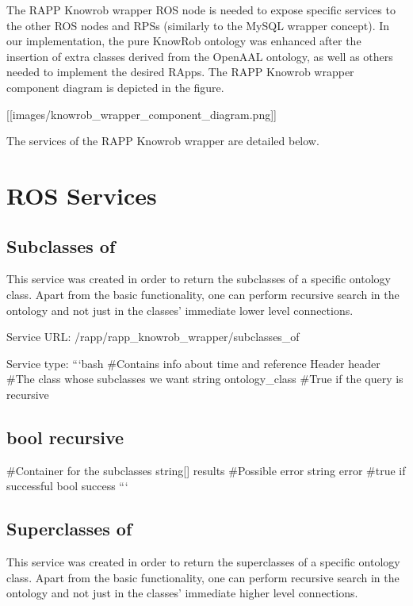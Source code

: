 The R\-A\-P\-P Knowrob wrapper R\-O\-S node is needed to expose specific services to the other R\-O\-S nodes and R\-P\-Ss (similarly to the My\-S\-Q\-L wrapper concept). In our implementation, the pure Know\-Rob ontology was enhanced after the insertion of extra classes derived from the Open\-A\-A\-L ontology, as well as others needed to implement the desired R\-Apps. The R\-A\-P\-P Knowrob wrapper component diagram is depicted in the figure.

\mbox{[}\mbox{[}images/knowrob\-\_\-wrapper\-\_\-component\-\_\-diagram.\-png\mbox{]}\mbox{]}

The services of the R\-A\-P\-P Knowrob wrapper are detailed below.

\section*{R\-O\-S Services}

\subsection*{Subclasses of}

This service was created in order to return the subclasses of a specific ontology class. Apart from the basic functionality, one can perform recursive search in the ontology and not just in the classes’ immediate lower level connections.

Service U\-R\-L\-: {\ttfamily /rapp/rapp\-\_\-knowrob\-\_\-wrapper/subclasses\-\_\-of}

Service type\-: ```bash \#\-Contains info about time and reference Header header \#\-The class whose subclasses we want string ontology\-\_\-class \#\-True if the query is recursive \subsection*{bool recursive }

\#\-Container for the subclasses string\mbox{[}\mbox{]} results \#\-Possible error string error \#true if successful bool success ```

\subsection*{Superclasses of}

This service was created in order to return the superclasses of a specific ontology class. Apart from the basic functionality, one can perform recursive search in the ontology and not just in the classes’ immediate higher level connections.

